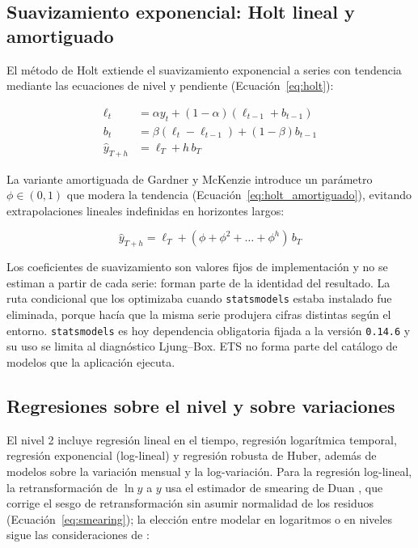 \documentclass[12pt]{article}
\begin{document}
\subsection{Suavizamiento exponencial: Holt lineal y amortiguado}

El m\'etodo de Holt \citep{holt1957} extiende el suavizamiento exponencial a series con tendencia mediante las ecuaciones de nivel y pendiente (Ecuaci\'on~\ref{eq:holt}):

\begin{equation}
\begin{aligned}
\ell_t &= \alpha y_t + (1-\alpha)(\ell_{t-1} + b_{t-1})\\
b_t &= \beta(\ell_t - \ell_{t-1}) + (1-\beta)b_{t-1}\\
\hat{y}_{T+h} &= \ell_T + h\,b_T
\end{aligned}
\label{eq:holt}
\end{equation}

La variante amortiguada de Gardner y McKenzie \citep{gardner_mckenzie1985} introduce un par\'ametro $\phi\in(0,1)$ que modera la tendencia (Ecuaci\'on~\ref{eq:holt_amortiguado}), evitando extrapolaciones lineales indefinidas en horizontes largos:

\begin{equation}
\hat{y}_{T+h} = \ell_T + (\phi + \phi^2 + \dots + \phi^h)\,b_T
\label{eq:holt_amortiguado}
\end{equation}

Los coeficientes de suavizamiento son valores fijos de implementaci\'on y no se estiman a partir de cada serie: forman parte de la identidad del resultado. La ruta condicional que los optimizaba cuando \texttt{statsmodels} estaba instalado fue eliminada, porque hac\'ia que la misma serie produjera cifras distintas seg\'un el entorno. \texttt{statsmodels} es hoy dependencia obligatoria fijada a la versi\'on \texttt{0.14.6} y su uso se limita al diagn\'ostico Ljung--Box. ETS no forma parte del cat\'alogo de modelos que la aplicaci\'on ejecuta.

\subsection{Regresiones sobre el nivel y sobre variaciones}

El nivel 2 incluye regresi\'on lineal en el tiempo, regresi\'on logar\'itmica temporal, regresi\'on exponencial (log-lineal) y regresi\'on robusta de Huber, adem\'as de modelos sobre la variaci\'on mensual y la log-variaci\'on. Para la regresi\'on log-lineal, la retransformaci\'on de $\ln y$ a $y$ usa el estimador de smearing de Duan \citep{duan1983}, que corrige el sesgo de retransformaci\'on sin asumir normalidad de los residuos (Ecuaci\'on~\ref{eq:smearing}); la elecci\'on entre modelar en logaritmos o en niveles sigue las consideraciones de \citep{manning_mullahy2001}:
\end{document}
